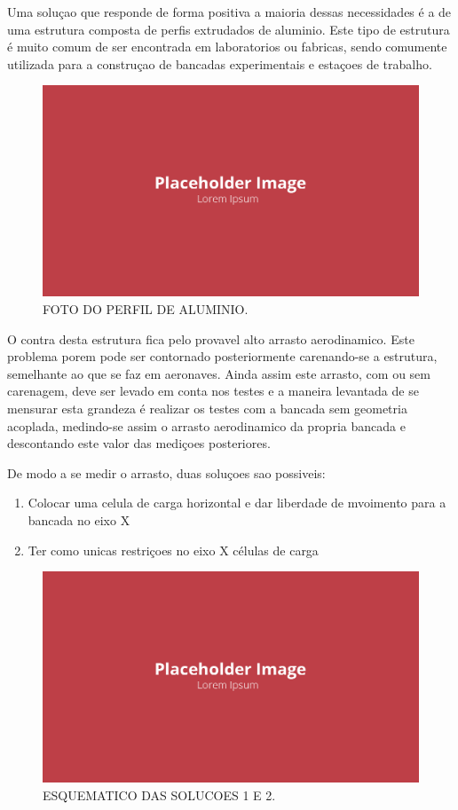 Uma soluçao que responde de forma positiva a maioria dessas necessidades é a de uma estrutura composta de perfis extrudados de aluminio. Este tipo de estrutura é muito comum de ser encontrada em laboratorios ou fabricas, sendo comumente utilizada para a construçao de bancadas experimentais e estaçoes de trabalho.

\begin{figure}[!ht]
    \centering
    \includegraphics[width=.8\linewidth]{figuras/placeholder.png}
    \caption{FOTO DO PERFIL DE ALUMINIO\cite{autor}.}
    \label{fig:placeholder}
\end{figure}

O contra desta estrutura fica pelo provavel alto arrasto aerodinamico. Este problema porem pode ser contornado posteriormente carenando-se a estrutura, semelhante ao que se faz em aeronaves. Ainda assim este arrasto, com ou sem carenagem, deve ser levado em conta nos testes e a maneira levantada de se mensurar esta grandeza é realizar os testes com a bancada sem geometria acoplada, medindo-se assim o arrasto aerodinamico da propria bancada e descontando este valor das mediçoes posteriores.

De modo a se medir o arrasto, duas soluçoes sao possiveis: 

\begin{enumerate}
    \item Colocar uma celula de carga horizontal e dar liberdade de mvoimento para a bancada no eixo X
    \item Ter como unicas restriçoes no eixo X células de carga
\end{enumerate}

\begin{figure}[!ht]
    \centering
    \includegraphics[width=.8\linewidth]{figuras/placeholder.png}
    \caption{ESQUEMATICO DAS SOLUCOES 1 E 2\cite{autor}.}
    \label{fig:placeholder}
\end{figure}

